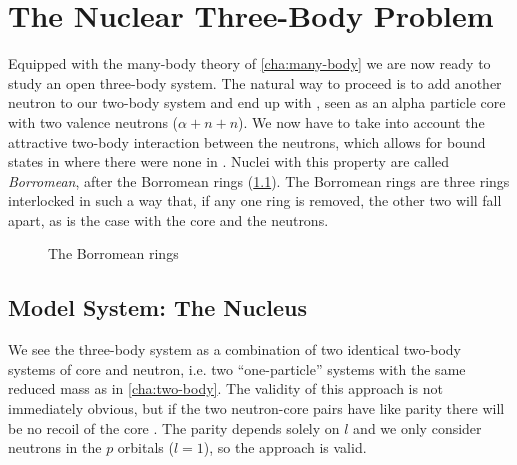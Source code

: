 \documentclass[../main/report.tex]{subfiles}
\begin{document}
\chapter{The Nuclear Three-Body Problem}
\label{cha:three-body}

Equipped with the many-body theory of \cref{cha:many-body} we are now ready to study an open three-body system.
The natural way to proceed is to add another neutron to our two-body  system and end up with , seen as an alpha particle core with two valence neutrons ($\alpha + n + n$).
We now have to take into account the attractive two-body interaction between the neutrons, which allows for bound states in  where there were none in .
Nuclei with this property are called \emph{Borromean}, after the Borromean rings (\cref{fig:borromean}). 
The Borromean rings are three rings interlocked in such a way that, if any one ring is removed, the other two will fall apart, as is the case with the core and the neutrons.

\begin{figure}[h]
  \newcommand{\circdist}{1.2}
  \newcommand{\circrad}{2}
  \centering
  \caption{The Borromean rings}
  \label{fig:borromean}
\end{figure}

\section{Model System: The  Nucleus}

We see the three-body system as a combination of two identical two-body systems of core and neutron, i.e. two ``one-particle'' systems with the same reduced mass as in \cref{cha:two-body}.
The validity of this approach is not immediately obvious, but 
if the two neutron-core pairs have like parity there will be no recoil of the core \cite{suzuki}. 
The parity depends solely on $l$ and we only consider neutrons in the $p$ orbitals ($l=1$), so the approach is valid.
\end{document}

